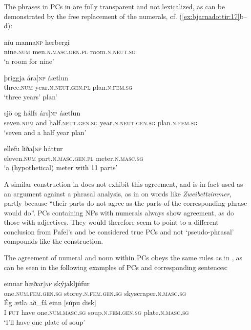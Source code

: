 \documentclass[output=paper]{LSP/langsci}
\begin{document}
\begin{xlist}
The phrases in PCs in  are fully transparent and not lexicalized, as can be demonstrated by the free replacement of the numerals, cf. (\ref{ex:bjarnadottir:17}b–d):

\ea%
 \label{ex:bjarnadottir:18} 
\ea 
\gll {\ob}níu manna{\cb}\textsc{np} herbergi\\
 nine\textsc{.num} men\textsc{.n.masc.gen.pl} room\textsc{.n.neut.sg}\\
\glt ‘a room for nine’

\ex
\gll {\ob}þriggja ára]\textsc{np} áætlun\\
 three\textsc{.num} year\textsc{.n.neut.gen.pl} plan\textsc{.n.fem.sg}\\
\glt ‘three years’ plan’

\ex
\gll {\ob}sjö og  hálfs árs]\textsc{np}  áætlun\\
 seven\textsc{.num} and half\textsc{.neut.gen.sg} year\textsc{.n.neut.gen.sg} plan\textsc{.n.fem.sg}\\
\glt ‘seven and a half year plan’

\ex
\gll {\ob}ellefu liða]\textsc{np} háttur\\
 eleven\textsc{.num} part\textsc{.n.masc.gen.pl} meter\textsc{.n.masc.sg}\\
\glt ‘a (hypothetical) meter with 11 parts’
\z
\z

A similar construction in  does not exhibit this agreement, and is in fact used as an argument against a phrasal analysis, as in \citet{Pafel2015} on words like \textit{Zweibettzimmer}, partly because “their parts do not agree as the parts of the corresponding phrase would do”.  PCs containing NPs with numerals always show agreement, as do those with adjectives. They would therefore seem to point to a different conclusion from Pafel’s and be considered true PCs and not ‘pseudo-phrasal’ compounds like the  construction.

The agreement of numeral and noun within PCs obeys the same rules as in , as can be seen in the following examples of PCs and corresponding sentences:

\ea%
 \label{ex:bjarnadottir:19} 
\ea
\gll {\ob}einnar hæðar]\textsc{np} skýjakljúfur\\
 one\textsc{.num.fem.gen.sg} storey\textsc{.n.fem.gen.sg} skyscraper\textsc{.n.masc.sg}\\

\gll Ég ætla að\_fá einn  [súpu disk] \\
 I \textsc{fut} have one\textsc{.num.masc.sg} soup\textsc{.n.fem.gen.sg} plate\textsc{.n.masc.sg}\\
\glt ‘I'll have one plate of soup’


\end{xlist}
\end{document}
